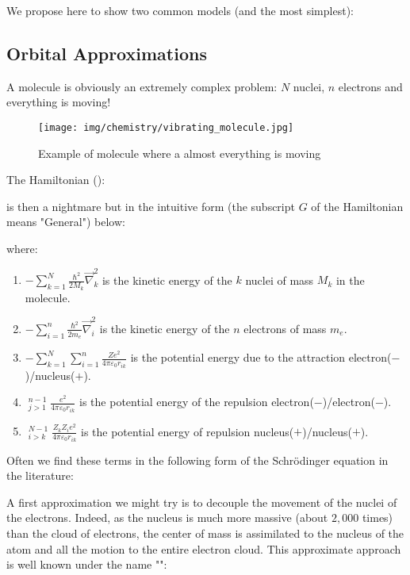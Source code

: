 	We propose here to show two common models (and the most simplest):
	
	\subsection{Orbital Approximations}
	A molecule is obviously an extremely complex problem: $N$ nuclei, $n$ electrons and everything is moving!
	\begin{figure}[H]
		\begin{center}
		\texttt{[image: img/chemistry/vibrating\_molecule.jpg]}
		\end{center}	
		\caption{Example of molecule where a almost everything is moving}
	\end{figure}
	The Hamiltonian ():
	
	is then a nightmare but in the intuitive form (the subscript $G$ of the Hamiltonian means "General") below:
	
	where:
	
	\begin{enumerate}
		\item $\displaystyle-\sum_{k=1}^{N}\frac{\hbar^2}{2M_k}\vec{\nabla}_k^2$ is the kinetic energy of the $k$ nuclei of mass $M_k$ in the molecule.

		\item $\displaystyle-\sum_{i=1}^{n}\frac{\hbar^2}{2m_e}\vec{\nabla}_i^2$  is the kinetic energy of the $n$ electrons of mass $m_e$.

		\item $\displaystyle-\sum_{k=1}^{N}\sum_{i=1}^{n}\frac{Ze^2}{4\pi\varepsilon_0 r_{ik}}$ is the potential energy due to the attraction electron($-$)/nucleus($+$).

		\item $\displaystyle\mathop{\sum_{i=1}}_{j>1}^{n-1}\frac{e^2}{4\pi\varepsilon_0 r_{ik}}$ is the potential energy of the repulsion electron($-$)/electron($-$).

		\item $\displaystyle\mathop{\sum_{k=1}}_{i>k}^{N-1}\frac{Z_kZ_ie^2}{4\pi\varepsilon_0 r_{ik}}$ is the potential energy of repulsion nucleus($+$)/nucleus($+$).
	\end{enumerate}

	Often we find these terms in the following form of the Schrödinger equation in the literature:
	
	A first approximation we might try is to decouple the movement of the nuclei of the electrons. Indeed, as the nucleus is much more massive (about $2,000$ times) than the cloud of electrons, the center of mass is assimilated to the nucleus of the atom and all the motion to the entire electron cloud. This approximate approach is well known under the name "":
	
